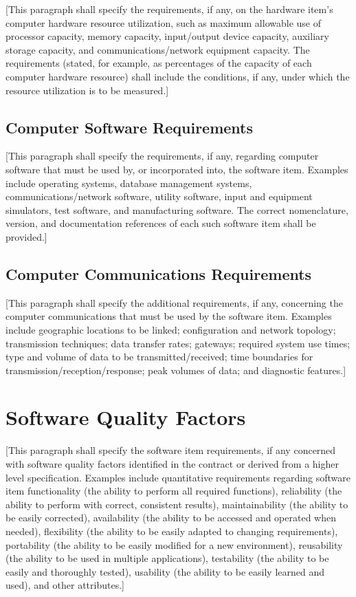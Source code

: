 [This paragraph shall specify the requirements, if any, on the hardware item's computer hardware resource utilization, such as maximum allowable use of processor capacity, memory capacity, input/output device capacity, auxiliary storage capacity, and communications/network equipment capacity. The requirements (stated, for example, as percentages of the capacity of each computer hardware resource) shall include the conditions, if any, under which the resource utilization is to be measured.]

\subsection{Computer Software Requirements\label{ref-021}}

[This paragraph shall specify the requirements, if any, regarding computer software that must be used by, or incorporated into, the software item. Examples include operating systems, database management systems, communications/network software, utility software, input and equipment simulators, test software, and manufacturing software. The correct nomenclature, version, and documentation references of each such software item shall be provided.]

\subsection{Computer Communications Requirements\label{ref-022}}

[This paragraph shall specify the additional requirements, if any, concerning the computer communications that must be used by the software item. Examples include geographic locations to be linked; configuration and network topology; transmission techniques; data transfer rates; gateways; required system use times; type and volume of data to be transmitted/received; time boundaries for transmission/reception/response; peak volumes of data; and diagnostic features.]

\section{Software Quality Factors\label{ref-023}}

[This paragraph shall specify the software item requirements, if any concerned with software quality factors identified in the contract or derived from a higher level specification. Examples include quantitative requirements regarding software item functionality (the ability to perform all required functions), reliability (the ability to perform with correct, consistent results), maintainability (the ability to be easily corrected), availability (the ability to be accessed and operated when needed), flexibility (the ability to be easily adapted to changing requirements), portability (the ability to be easily modified for a new environment), reusability (the ability to be used in multiple applications), testability (the ability to be easily and thoroughly tested), usability (the ability to be easily learned and used), and other attributes.]

